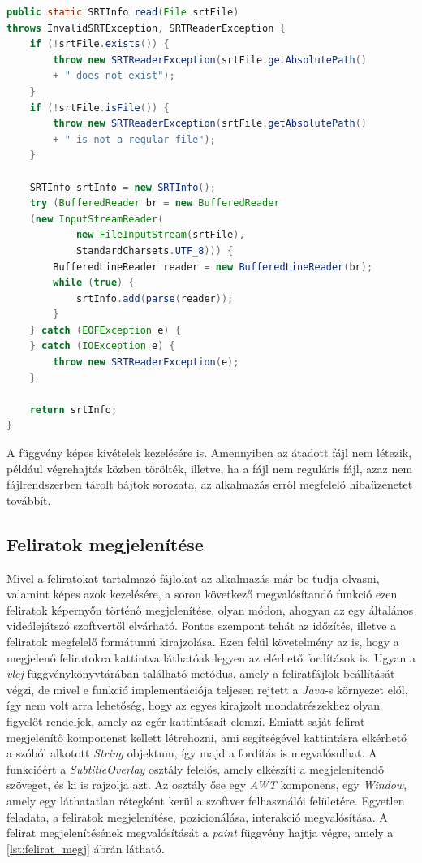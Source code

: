 \begin{lstlisting}[caption=Srt fájlok feldolgozása, label={lst:srt_feldolgozas}, language=java]
public static SRTInfo read(File srtFile) 
throws InvalidSRTException, SRTReaderException {
    if (!srtFile.exists()) {
        throw new SRTReaderException(srtFile.getAbsolutePath()
        + " does not exist");
    }
    if (!srtFile.isFile()) {
        throw new SRTReaderException(srtFile.getAbsolutePath()
        + " is not a regular file");
    }

    SRTInfo srtInfo = new SRTInfo();
    try (BufferedReader br = new BufferedReader
    (new InputStreamReader(
            new FileInputStream(srtFile),
            StandardCharsets.UTF_8))) {
        BufferedLineReader reader = new BufferedLineReader(br);
        while (true) {
            srtInfo.add(parse(reader));
        }
    } catch (EOFException e) {
    } catch (IOException e) {
        throw new SRTReaderException(e);
    }
    
    return srtInfo;
}
\end{lstlisting}

  A függvény képes kivételek kezelésére is. Amennyiben az átadott fájl nem létezik, például végrehajtás közben törölték, illetve, ha a fájl nem reguláris fájl, azaz nem fájlrendszerben tárolt bájtok sorozata, az alkalmazás erről megfelelő hibaüzenetet továbbít.
  
\subsection{Feliratok megjelenítése}
Mivel a feliratokat tartalmazó fájlokat az alkalmazás már be tudja olvasni, valamint képes azok kezelésére, a soron következő megvalósítandó funkció ezen feliratok képernyőn történő megjelenítése, olyan módon, ahogyan az egy általános videólejátszó szoftvertől elvárható. Fontos szempont tehát az időzítés, illetve a feliratok megfelelő formátumú kirajzolása. Ezen felül követelmény az is, hogy a megjelenő feliratokra kattintva láthatóak legyen az elérhető fordítások is. Ugyan a \textit{vlcj} függvénykönyvtárában található metódus, amely a feliratfájlok beállítását végzi, de mivel e funkció implementációja teljesen rejtett a \textit{Java}-s környezet elől, így nem volt arra lehetőség, hogy az egyes kirajzolt mondatrészekhez olyan figyelőt rendeljek, amely az egér kattintásait elemzi. Emiatt saját felirat megjelenítő komponenst kellett létrehozni, ami segítségével kattintásra elkérhető a szóból alkotott \textit{String} objektum, így majd a fordítás is megvalósulhat. A funkcióért a \textit{SubtitleOverlay} osztály felelős, amely elkészíti a megjelenítendő szöveget, és ki is rajzolja azt. Az osztály őse egy \textit{AWT} komponens, egy \textit{Window}, amely egy láthatatlan rétegként kerül a szoftver felhasználói felületére. Egyetlen feladata, a feliratok megjelenítése, pozicionálása, interakció megvalósítása. A felirat megjelenítésének megvalósítását a \textit{paint} függvény hajtja végre, amely a \ref{lst:felirat_megj} ábrán látható.

